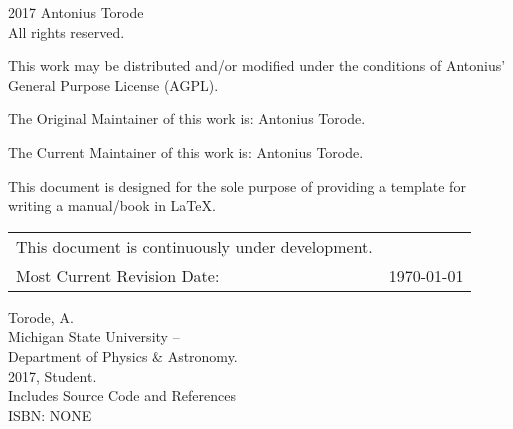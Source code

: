 \pagestyle{empty}
\begingroup
\footnotesize
\parindent 0pt
\parskip \baselineskip
\textcopyright{} 2017 Antonius Torode \\
All rights reserved.

This work may be distributed and/or modified under the conditions of Antonius’ General Purpose License (AGPL).

The Original Maintainer of this work is: Antonius Torode.

The Current Maintainer of this work is: Antonius Torode.

This document is designed for the sole purpose of providing a template for writing a manual/book in LaTeX.


\begin{center}
\begin{tabular}{ll}
This document is continuously under development. \\
Most Current Revision Date: &  \today 
\end{tabular}
\end{center}

\vfill

Torode, A.\\
\hspace*{2em} Michigan State University -- \\
\hspace*{2em} Department of Physics \& Astronomy. \\
\hspace*{2em} 2017, Student. \\
\hspace*{2em} Includes Source Code and References \\
\hspace*{2em} ISBN: NONE \\



\endgroup
\clearpage